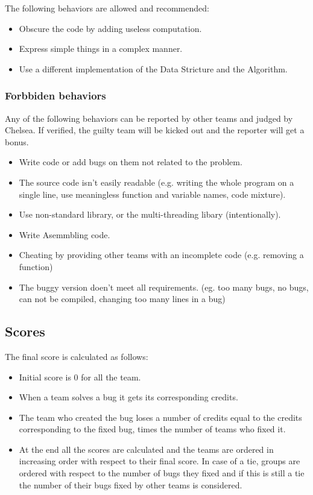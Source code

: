 \documentclass[11pt,a4paper]{article}
\begin{document}
The following behaviors are allowed and recommended:

\begin{itemize}
  \item Obscure the code by adding useless computation.
  \item Express simple things in a complex manner.
  \item Use a different implementation of the Data Stricture and the Algorithm.
\end{itemize}

\subsubsection{Forbbiden behaviors}

Any of the following behaviors can be reported by other teams and judged by Chelsea. If verified, the guilty team will be kicked out and the reporter will get a bonus.

\begin{itemize}
  \item Write code or add bugs on them not related to the problem.
  \item The source code isn't easily readable (e.g. writing the whole program on a single line, use meaningless function and variable names, code mixture).
  \item Use non-standard library, or the multi-threading libary (intentionally).
  \item Write Asemmbling code.
  \item Cheating by providing other teams with an incomplete code (e.g. removing a function)
  \item The buggy version doen't meet all requirements. (eg. too many bugs, no bugs, can not be compiled, changing too many lines in a bug)
\end{itemize}

\subsection{Scores}

The final score is calculated as follows:
\begin{itemize}
  \item Initial score is 0 for all the team.
  \item When a team solves a bug it gets its corresponding credits.
  \item The team who created the bug loses a number of credits equal to the credits corresponding to the
        fixed bug, times the number of teams who fixed it.
  \item At the end all the scores are calculated and the teams are ordered in increasing order with respect
        to their final score. In case of a tie, groups are ordered with respect to the number of bugs they
        fixed and if this is still a tie the number of their bugs fixed by other teams is considered.
\end{itemize}
\end{document}
